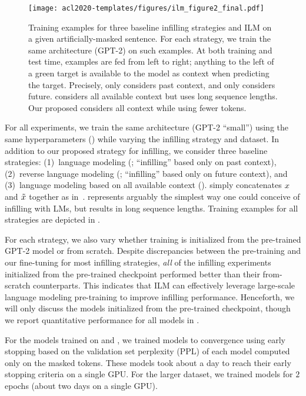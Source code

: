 \begin{figure}[t]
    \centering
    \texttt{[image: acl2020-templates/figures/ilm\_figure2\_final.pdf]}
    \vspace{-2cm}
    \caption{
    Training examples for three baseline infilling strategies and ILM on a given artificially-masked sentence. 
    For each strategy, we train the same architecture (GPT-2) on such examples. 
    At both training and test time, examples are fed from left to right; anything to the left of a green target is available to the model as context when predicting the target.
    Precisely, \lm{} only considers past context, and \lmrev{} only considers future. \lmall{} considers all available context but uses long sequence lengths. Our proposed \ilm{} considers all context while using fewer tokens. 
    }
    \label{fig:training_examples}
\end{figure}

For all experiments, we train the same architecture (GPT-2 ``small'') using the same hyperparameters () while varying the infilling strategy and dataset. 
In addition to our proposed \ilm{} strategy for infilling, we consider three baseline strategies:
(1)~language modeling (\lm{}; ``infilling'' based only on past context),
(2)~reverse language modeling (\lmrev{}; ``infilling'' based only on future context),
and 
(3)~language modeling based on all available context (\lmall{}).
\lmall{} simply concatenates $x$ and $\tilde{x}$ together as in~\citet{fedus2018maskgan}. 
\lmall{} represents arguably the simplest way one could conceive of infilling with LMs, 
but results in long sequence lengths.
Training examples for all strategies are depicted in .

For each strategy, we also vary whether training is initialized from the pre-trained GPT-2 model or from scratch.
Despite discrepancies between the pre-training and our fine-tuning for most infilling strategies, 
\emph{all} of the infilling experiments initialized from the pre-trained checkpoint performed better than their from-scratch counterparts.
This indicates that ILM can effectively leverage large-scale language modeling pre-training to improve infilling performance. 
Henceforth, we will only discuss the models initialized from the pre-trained checkpoint, though we report quantitative performance for all models in .

For the models trained on \stories{} and \abstracts{}, we trained models to convergence using early stopping based on the validation set perplexity (PPL) of each model computed only on the masked tokens. 
These models took about a day to reach their early stopping criteria on a single GPU. 
For the larger \lyrics{} dataset, we trained models for $2$ epochs (about two days on a single GPU). 